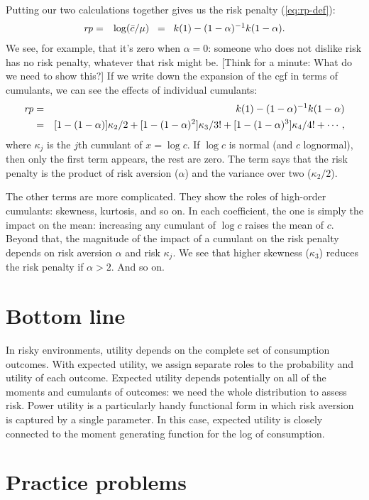 \documentclass[11pt]{article}
\begin{document}
Putting our two calculations together gives us the risk penalty (\ref{eq:rp-def}):
\begin{eqnarray*}
    \mbox{\em rp\/} &=& \log (\bar{c}/\mu)  \;\;=\;\; k(1) - (1-\alpha)^{-1} k(1-\alpha) .
\end{eqnarray*}
We see, for example, that it's zero when $\alpha = 0$:
someone who does not dislike risk has no risk penalty,
whatever that risk might be.
[Think for a minute:  What do we need to show this?]
If we write down the expansion of the cgf in terms of cumulants,
we can see the effects of individual cumulants:
\begin{eqnarray}
    \mbox{\em rp\/} &=& k(1) - (1-\alpha)^{-1} k(1-\alpha) \nonumber \\
        &=& [1-(1-\alpha)] \kappa_2/2 + [1- (1-\alpha)^2] \kappa_3/3!
            + [1- (1-\alpha)^3] \kappa_4/4! + \cdots ,
        \label{eq:rp-cum-expansion}
\end{eqnarray}
where $\kappa_j$ is the $j$th cumulant of $x = \log c$.
If $\log c$ is normal (and $c$ lognormal), then only the first term appears,
the rest are zero.
The term says that the risk penalty is the product of risk aversion ($\alpha$)
and the variance over two ($\kappa_2/2$).

The other terms are more complicated.
They show the roles of high-order cumulants:  skewness, kurtosis, and so on.
In each coefficient, the one is simply the impact on the mean:
increasing any cumulant of $\log c$ raises the mean of $c$.
Beyond that, the magnitude of the impact of a cumulant
on the risk penalty depends on risk aversion $\alpha$ and risk $\kappa_j$.
We see that higher skewness ($\kappa_3$) reduces the risk penalty if $\alpha > 2$.
And so on.


\section*{Bottom line}

In risky environments, utility depends
on the complete set of consumption outcomes.
With expected utility, we assign separate roles to the probability
and utility of each outcome.
Expected utility depends potentially on all of the moments and cumulants
of outcomes:
we need the whole distribution to assess risk.
Power utility is a particularly handy functional form
in which risk aversion is captured by a single parameter.
In this case, expected utility is closely connected to the
moment generating function for the log of consumption.

\section*{Practice problems}
\end{document}

